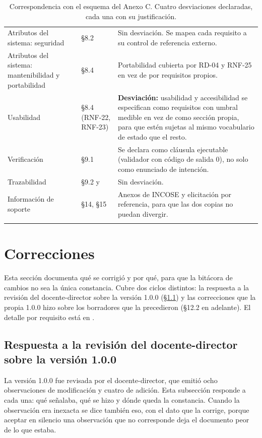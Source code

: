 \documentclass[11pt,a4paper]{article}
\DeclareRobustCommand{\cd}[1]{\texttt{\protect\seqsplit{#1}}}
\begin{document}
\begin{longtable}{p{5.1cm} p{4.1cm} p{5.2cm}}
Atributos del sistema: seguridad & \S8.2 & Sin desviación. Se mapea cada requisito a su control
de referencia externo. \\
Atributos del sistema: mantenibilidad y portabilidad & \S8.4 & Portabilidad cubierta por RD-04 y
RNF-25 en vez de por requisitos propios. \\
Usabilidad & \S8.4 (RNF-22, RNF-23) & \textbf{Desviación:} usabilidad y accesibilidad se
especifican como requisitos con umbral medible en vez de como sección propia, para que estén
sujetas al mismo vocabulario de estado que el resto. \\
Verificación & \S9.1 & Se declara como cláusula ejecutable (validador con código de salida 0), no
solo como enunciado de intención. \\
Trazabilidad & \S9.2 y \cd{matriz.csv} & Sin desviación. \\
Información de soporte & \S14, \S15 & Anexos de INCOSE y elicitación por referencia, para que las
dos copias no puedan divergir. \\
\bottomrule
\caption{Correspondencia con el esquema del Anexo C. Cuatro desviaciones declaradas, cada una
con su justificación.}
\end{longtable}

\section{Correcciones}
\label{sec:cambios}

Esta sección documenta qué se corrigió y por qué, para que la bitácora de cambios no sea la única
constancia. Cubre dos ciclos distintos: la respuesta a la revisión del docente-director sobre la
versión 1.0.0 (\S\ref{sec:respuesta}) y las correcciones que la propia 1.0.0 hizo sobre los
borradores que la precedieron (\S12.2 en adelante). El detalle por requisito está en
\cd{docs/requisitos/CHANGELOG-REQ.md}.

\subsection{Respuesta a la revisión del docente-director sobre la versión 1.0.0}
\label{sec:respuesta}

La versión 1.0.0 fue revisada por el docente-director, que emitió ocho observaciones de
modificación y cuatro de adición. Esta subsección responde a cada una: qué señalaba, qué se hizo y
dónde queda la constancia. Cuando la observación era inexacta se dice también eso, con el dato
que la corrige, porque aceptar en silencio una observación que no corresponde deja el documento
peor de lo que estaba.
\end{document}
